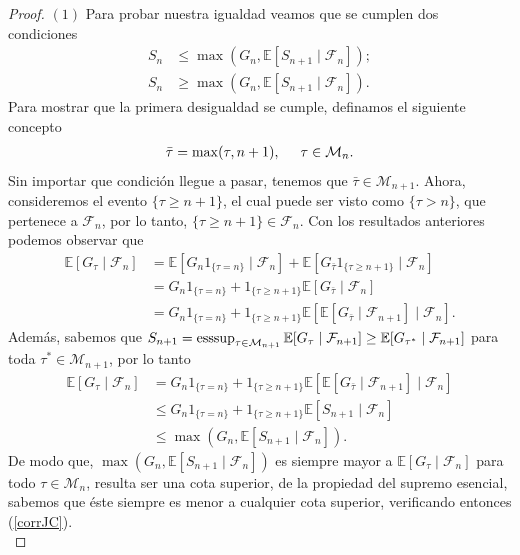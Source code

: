 \begin{proof}
$(1)$ Para probar nuestra igualdad veamos que se cumplen dos condiciones
	\begin{align}
	S_n & \leq \max (G_n, \mathbb{E}[S_{n+1} \mid \mathcal{F}_n]);  \label{corrJC} \\
	S_n & \geq \max (G_n, \mathbb{E}[S_{n+1} \mid \mathcal{F}_n]). \label{corrJC2}
	\end{align}
Para mostrar que la primera desigualdad se cumple, definamos el siguiente concepto
	\begin{align*}
	\bar{\tau} = \max(\tau, n+1), \hspace{0.5cm} \tau \in \mathcal{M}_n.
	\end{align*}
Sin importar que condición llegue a pasar, tenemos que $\bar{\tau} \in \mathcal{M}_{n+1}$. Ahora, consideremos el evento $\{\tau \geq n+1\}$, el cual puede ser visto como $\{\tau > n\}$, que pertenece a $\mathcal{F}_n$, por lo tanto, $\{\tau \geq n+1\} \in \mathcal{F}_n$. Con los resultados anteriores podemos observar que
	\begin{align*}
	\mathbb{E}[G_\tau \mid \mathcal{F}_n] & = \mathbb{E}[G_n 1_{\{\tau = n\}} \mid \mathcal{F}_n] + \mathbb{E}[G_{\bar{\tau}} 1_{\{\tau \geq n+1\}} \mid \mathcal{F}_n] \\
	& = G_n 1_{\{\tau = n\}} + 1_{\{\tau \geq n+1\}}  \mathbb{E}[G_{\bar{\tau}} \mid \mathcal{F}_n] \\
	& = G_n 1_{\{\tau = n\}} + 1_{\{\tau \geq n+1\}}  \mathbb{E}[ \mathbb{E} [G_{\bar{\tau}} \mid \mathcal{F}_{n+1}] \mid \mathcal{F}_n].
	\end{align*}
Además, sabemos que $S_{n+1} = \operatorname*{esssup}_{\tau \in \mathcal{M}_{n+1}} \mathbb{E}[G_\tau \mid \mathcal{F}_{n+1}] \geq \mathbb{E}[G_{\tau^{*}} \mid \mathcal{F}_{n+1}]$ para toda $\tau^{*} \in \mathcal{M}_{n+1}$, por lo tanto
	\begin{align}
	\mathbb{E}[G_\tau \mid \mathcal{F}_n] & = G_n 1_{\{\tau = n\}} + 1_{\{\tau \geq n+1\}}  \mathbb{E}[ \mathbb{E} [G_{\bar{\tau}} \mid \mathcal{F}_{n+1}] \mid \mathcal{F}_n] \nonumber \\
	& \leq G_n 1_{\{\tau = n\}} + 1_{\{\tau \geq n+1\}}  \mathbb{E}[ S_{n+1} \mid \mathcal{F}_n] \nonumber \\ 
	& \leq \max (G_n, \mathbb{E}[S_{n+1} \mid \mathcal{F}_n]).
	\end{align}
De modo que,  $\max (G_n, \mathbb{E}[S_{n+1} \mid \mathcal{F}_n])$ es siempre mayor a $\mathbb{E}[G_\tau \mid \mathcal{F}_n]$ para todo $\tau \in \mathcal{M}_n$, resulta ser una cota superior, de la propiedad del supremo esencial, sabemos que éste siempre es menor a cualquier cota superior, verificando entonces (\ref{corrJC}). \\


\end{proof}
